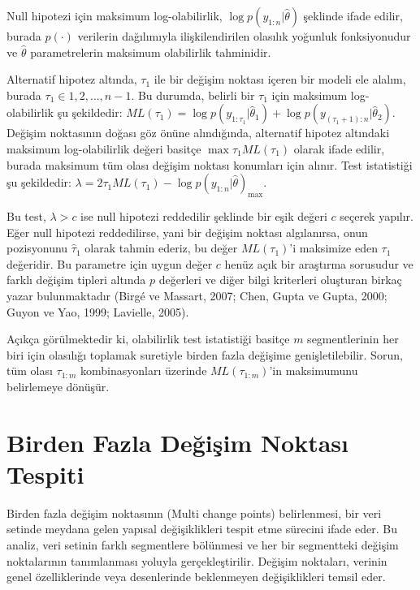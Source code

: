 \documentclass[12pt,twoside]{deuthesis}
\begin{document}
Null hipotezi için maksimum log-olabilirlik, \(\log p(y_{1:n}|\hat{\theta})\) şeklinde ifade edilir, burada \(p(\cdot)\) verilerin dağılımıyla ilişkilendirilen olasılık yoğunluk fonksiyonudur ve \(\hat{\theta}\) parametrelerin maksimum olabilirlik tahminidir.

Alternatif hipotez altında, \(\tau_1\) ile bir değişim noktası içeren bir modeli ele alalım, burada \(\tau_1 \in {1, 2, \dots, n - 1}\). Bu durumda, belirli bir \(\tau_1\) için maksimum log-olabilirlik şu şekildedir: \(ML(\tau_1) = \log p(y_{1:\tau_1}|\hat{\theta}_1) + \log p(y_{(\tau_1+1):n}|\hat{\theta}_2)\). Değişim noktasının doğası göz önüne alındığında, alternatif hipotez altındaki maksimum log-olabilirlik değeri basitçe \(\max{\tau_1} ML(\tau_1)\) olarak ifade edilir, burada maksimum tüm olası değişim noktası konumları için alınır. Test istatistiği şu şekildedir: \(\lambda = 2\tau_1 ML(\tau_1) - \log p(y_{1:n}|\hat{\theta})_{\max}\).

Bu test, \(\lambda > c\) ise null hipotezi reddedilir şeklinde bir eşik değeri \(c\) seçerek yapılır. Eğer null hipotezi reddedilirse, yani bir değişim noktası algılanırsa, onun pozisyonunu \(\hat{\tau}_1\) olarak tahmin ederiz, bu değer \(ML(\tau_1)\)'i maksimize eden \(\tau_1\) değeridir. Bu parametre için uygun değer \(c\) henüz açık bir araştırma sorusudur ve farklı değişim tipleri altında \(p\) değerleri ve diğer bilgi kriterleri oluşturan birkaç yazar bulunmaktadır (Birgé ve Massart, 2007; Chen, Gupta ve Gupta, 2000; Guyon ve Yao, 1999; Lavielle, 2005).

Açıkça görülmektedir ki, olabilirlik test istatistiği basitçe \(m\) segmentlerinin her biri için olasılığı toplamak suretiyle birden fazla değişime genişletilebilir. Sorun, tüm olası \(\tau_{1:m}\) kombinasyonları üzerinde \(ML(\tau_{1:m})\)'in maksimumunu belirlemeye dönüşür.

\hypertarget{birden-fazla-deux11fiux15fim-noktasux131-tespiti}{%
\section{Birden Fazla Değişim Noktası Tespiti}\label{birden-fazla-deux11fiux15fim-noktasux131-tespiti}}

Birden fazla değişim noktasının (Multi change points) belirlenmesi, bir veri setinde meydana gelen yapısal değişiklikleri tespit etme sürecini ifade eder. Bu analiz, veri setinin farklı segmentlere bölünmesi ve her bir segmentteki değişim noktalarının tanımlanması yoluyla gerçekleştirilir. Değişim noktaları, verinin genel özelliklerinde veya desenlerinde beklenmeyen değişiklikleri temsil eder.
\end{document}
